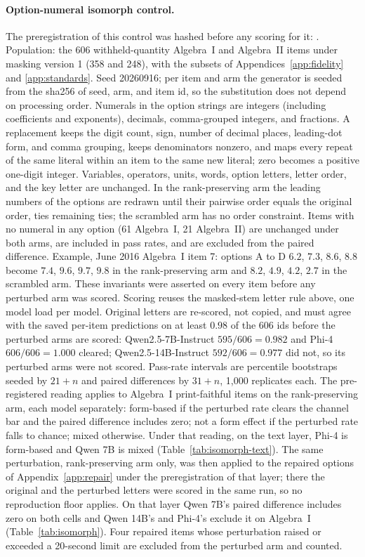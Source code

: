 \paragraph{Option-numeral isomorph control.}
The preregistration of this control was hashed before any scoring for it:
.
Population: the 606 withheld-quantity Algebra~I and Algebra~II items under masking version 1 (358 and 248), with the subsets of Appendices~\ref{app:fidelity} and \ref{app:standards}. Seed 20260916; per item and arm the generator is seeded from the sha256 of seed, arm, and item id, so the substitution does not depend on processing order. Numerals in the option strings are integers (including coefficients and exponents), decimals, comma-grouped integers, and fractions. A replacement keeps the digit count, sign, number of decimal places, leading-dot form, and comma grouping, keeps denominators nonzero, and maps every repeat of the same literal within an item to the same new literal; zero becomes a positive one-digit integer. Variables, operators, units, words, option letters, letter order, and the key letter are unchanged. In the rank-preserving arm the leading numbers of the options are redrawn until their pairwise order equals the original order, ties remaining ties; the scrambled arm has no order constraint. Items with no numeral in any option (61 Algebra~I, 21 Algebra~II) are unchanged under both arms, are included in pass rates, and are excluded from the paired difference. Example, June 2016 Algebra~I item 7: options A to D $6.2$, $7.3$, $8.6$, $8.8$ become $7.4$, $9.6$, $9.7$, $9.8$ in the rank-preserving arm and $8.2$, $4.9$, $4.2$, $2.7$ in the scrambled arm. These invariants were asserted on every item before any perturbed arm was scored. Scoring reuses the masked-stem letter rule above, one model load per model. Original letters are re-scored, not copied, and must agree with the saved per-item predictions on at least $0.98$ of the 606 ids before the perturbed arms are scored: Qwen2.5-7B-Instruct $595/606=0.982$ and Phi-4 $606/606=1.000$ cleared; Qwen2.5-14B-Instruct $592/606=0.977$ did not, so its perturbed arms were not scored. Pass-rate intervals are percentile bootstraps seeded by $21+n$ and paired differences by $31+n$, 1{,}000 replicates each. The pre-registered reading applies to Algebra~I print-faithful items on the rank-preserving arm, each model separately: form-based if the perturbed rate clears the channel bar and the paired difference includes zero; not a form effect if the perturbed rate falls to chance; mixed otherwise. Under that reading, on the text layer, Phi-4 is form-based and Qwen 7B is mixed (Table~\ref{tab:isomorph-text}). The same perturbation, rank-preserving arm only, was then applied to the repaired options of Appendix~\ref{app:repair} under the preregistration of that layer; there the original and the perturbed letters were scored in the same run, so no reproduction floor applies. On that layer Qwen 7B's paired difference includes zero on both cells and Qwen 14B's and Phi-4's exclude it on Algebra~I (Table~\ref{tab:isomorph}). Four repaired items whose perturbation raised or exceeded a 20-second limit are excluded from the perturbed arm and counted.

